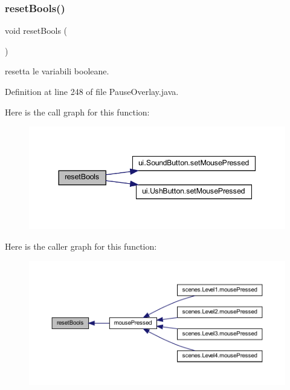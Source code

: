 \subsubsection{\texorpdfstring{reset\+Bools()}{resetBools()}}
{\footnotesize\ttfamily void reset\+Bools (\begin{DoxyParamCaption}{ }\end{DoxyParamCaption})}



resetta le variabili booleane. 



Definition at line 248 of file Pause\+Overlay.\+java.

Here is the call graph for this function\+:\nopagebreak
\begin{figure}[H]
\begin{center}
\leavevmode
\includegraphics[width=344pt]{classui_1_1_pause_overlay_a4506144774b5a18385cf2eb0f4ff5e42_cgraph}
\end{center}
\end{figure}
Here is the caller graph for this function\+:\nopagebreak
\begin{figure}[H]
\begin{center}
\leavevmode
\includegraphics[width=350pt]{classui_1_1_pause_overlay_a4506144774b5a18385cf2eb0f4ff5e42_icgraph}
\end{center}
\end{figure}
\mbox{\label{classui_1_1_pause_overlay_ac5c54df7ed3b930268c8d7752c101725}} 
